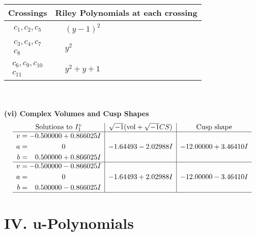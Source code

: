 \documentclass[1p]{elsarticle_modified}
\theoremstyle{definition}
\newcommand{\I}{\sqrt{-1}}
\begin{document}
\begin{tabular}{m{50pt}|m{274pt}}
Crossings & \hspace{64pt}Riley Polynomials at each crossing \\
\hline $$\begin{aligned}c_{1},c_{2},c_{5}\end{aligned}$$&$\begin{aligned}
&(y-1)^2
\end{aligned}$\\
\hline $$\begin{aligned}c_{3},c_{4},c_{7}\\c_{8}\end{aligned}$$&$\begin{aligned}
&y^2
\end{aligned}$\\
\hline $$\begin{aligned}c_{6},c_{9},c_{10}\\c_{11}\end{aligned}$$&$\begin{aligned}
&y^2+y+1
\end{aligned}$\\
\hline
\end{tabular}\\~\\
\newpage\flushleft \textbf{(vi) Complex Volumes and Cusp Shapes}
$$\begin{array}{c|c|c}  
\text{Solutions to }I^v_{1}& \I (\text{vol} + \sqrt{-1}CS) & \text{Cusp shape}\\
 \hline 
\begin{aligned}
v &= -0.500000 + 0.866025 I \\
a &= \phantom{-0.000000 } 0 \\
b &= \phantom{-}0.500000 + 0.866025 I\end{aligned}
 & -1.64493 - 2.02988 I & -12.00000 + 3.46410 I \\ \hline\begin{aligned}
v &= -0.500000 - 0.866025 I \\
a &= \phantom{-0.000000 } 0 \\
b &= \phantom{-}0.500000 - 0.866025 I\end{aligned}
 & -1.64493 + 2.02988 I & -12.00000 - 3.46410 I\\
 \hline 
 \end{array}$$\newpage
\newpage\renewcommand{\arraystretch}{1}
\centering \section*{ IV. u-Polynomials}
\end{document}
